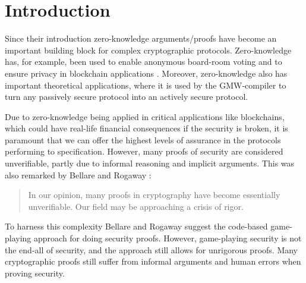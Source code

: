 \chapter{Introduction}
\label{ch:intro}
Since their introduction zero-knowledge arguments/proofs have become
an important building block for complex cryptographic protocols.
Zero-knowledge has, for example, been used to enable anonymous board-room
voting \cite{boardroom-voting} and to ensure privacy in blockchain applications \cite{concordium}.
Moreover, zero-knowledge also has important theoretical applications, where it
is used by the GMW-compiler to turn any passively secure protocol into an
actively secure protocol.

Due to zero-knowledge being applied in critical applications like
blockchains, which could have real-life financial consequences if the security is
broken, it is paramount that we can offer the highest levels of assurance in the
protocols performing to specification.
However, many proofs of security are considered unverifiable, partly due to informal
reasoning and implicit arguments. This was also remarked by Bellare and Rogaway \cite{game-playing}:

\begin{quote}
In our opinion, many proofs in cryptography have become essentially unverifiable. Our field may be approaching a crisis of rigor.
\end{quote}

To harness this complexity Bellare and Rogaway suggest the code-based game-playing approach
for doing security proofs.
However, game-playing security is not the end-all of security, and the approach
still allows for unrigorous proofs. Many cryptographic proofs still suffer
from informal arguments and human errors when proving security.


